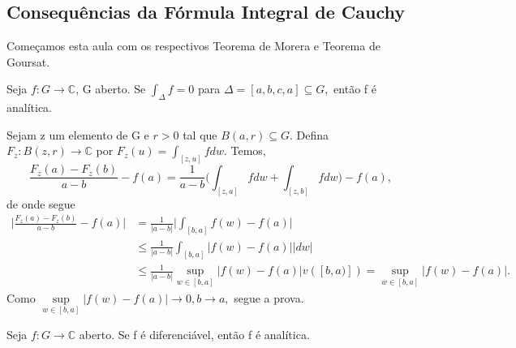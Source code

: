 \documentclass[ComplexAnalysis/complex.tex]{subfiles}
\begin{document}
\subsection{Consequências da Fórmula Integral de Cauchy}
Começamos esta aula com os respectivos Teorema de Morera e Teorema de Goursat.
\hypertarget{morera}{\begin{theorem*}
		Seja $f:G\rightarrow \mathbb{C}$, G aberto. Se $\int_{\Delta}^{}f = 0$ para $\Delta = [a, b, c, a]\subseteq{G},$ então
		f é analítica.
	\end{theorem*}}\begin{proof*}
	Sejam z um elemento de G e $r > 0$ tal que $B(a, r)\subseteq{G}.$ Defina
	$F_{z}:B(z, r)\rightarrow \mathbb{C}$ por $F_{z}(u) = \int_{[z, u]}^{}f dw.$
	Temos,
	$$
		\frac{F_{z}(a) - F_{z}(b)}{a - b} - f(a) = \frac{1}{a-b}\biggl(\int_{[z, a]}^{}fdw + \int_{[z, b]}^{}fdw\biggr) - f(a),
	$$
	de onde segue
	\begin{align*}
		\biggl|\frac{F_{z}(a) - F_{z}(b)}{a-b} - f(a)\biggr| & = \frac{1}{|a-b|}\biggl|\int_{[b, a]}f(w) - f(a)\biggr|                                      \\
		                                                     & \leq \frac{1}{|a-b|}\int_{[b, a]}^{}|f(w) - f(a)||dw|                                        \\
		                                                     & \leq \frac{1}{|a-b|}\sup_{w\in[b, a]}|f(w) - f(a)|v([b, a)]) = \sup_{w\in[b, a]}|f(w)-f(a)|.
	\end{align*}
	Como $\sup\limits_{w\in[b, a]}|f(w) - f(a)|\to0, b\to{a},$ segue a prova. \qedsymbol
\end{proof*}
\hypertarget{goursat}{\begin{theorem*}
		Seja $f:G\rightarrow \mathbb{C}$ aberto. Se f é diferenciável, então f é analítica.
	\end{theorem*}}
\end{document}
